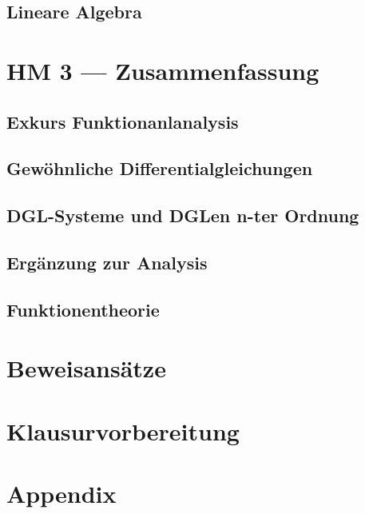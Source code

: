 \documentclass[10pt]{report}
\begin{document}
    \chapter{Lineare Algebra}
    

    \part{HM 3 --- Zusammenfassung}
	\chapter{Exkurs Funktionanlanalysis}
    

    \chapter{Gewöhnliche Differentialgleichungen}
    

    \chapter{DGL-Systeme und DGLen n-ter Ordnung}
    

    \chapter{Ergänzung zur Analysis}
    

    \chapter{Funktionentheorie}
    

    \part{Beweisansätze}
    

    \part{Klausurvorbereitung}
    

    \part{Appendix}
    
\end{document}
